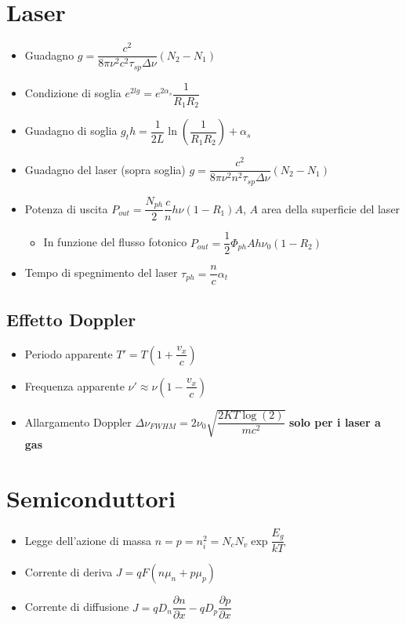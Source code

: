 \documentclass{article}
\begin{document}
\newpage

\section{Laser}
\begin{itemize}
  \item Guadagno \( g = \dfrac{c^2}{8 \pi \nu^2 c^2 \tau_{sp} \Delta \nu} (N_2 - N_1) \)
  \item Condizione di soglia \( e ^ {2lg} = e^ {2 \alpha_s } \dfrac{1}{R_1 R_2} \)
  \item Guadagno di soglia \( g_th = \dfrac{1}{2L} \ln\left(\dfrac{1}{R_1 R_2}\right) + \alpha_s \)
  \item Guadagno del laser (sopra soglia) \( g = \dfrac{c^2}{8 \pi \nu^2 n ^ 2 \tau_{sp} \Delta \nu} (N_2 - N_1) \)
  \item Potenza di uscita \( P_{out} = \dfrac{N_{ph}}{2} \dfrac{c}{n} h \nu (1 - R_1) A \), \( A \) area della superficie del laser
        \begin{itemize}
          \item In funzione del flusso fotonico \( P_{out} = \dfrac{1}{2} \Phi_{ph} A h \nu_0 ( 1 - R_2) \)
        \end{itemize}
  \item Tempo di spegnimento del laser \( \tau_{ph} = \dfrac{n}{c} \alpha_t \)
\end{itemize}

\subsection{Effetto Doppler}
\begin{itemize}
  \item Periodo apparente \( T ' = T \left( 1 + \dfrac{v_x}{c} \right) \)
  \item Frequenza apparente \( \nu ' \approx \nu \left(1 - \dfrac{v_x}{c} \right) \)
  \item Allargamento Doppler \( \Delta \nu_{FWHM} = 2 \nu_0 \sqrt{\dfrac{2 K T \log(2)}{m c ^ 2}} \) \textbf{solo per i laser a gas}
\end{itemize}

\newpage

\section{Semiconduttori}
\begin{itemize}
  \item Legge dell'azione di massa \( n = p = n_i ^ 2 = N_c N_v \exp{\dfrac{E_g}{k T}} \)
  \item Corrente di deriva \( J = q F (n \mu_n + p \mu_p) \)
  \item Corrente di diffusione \( J = q D_n \dfrac{\partial n}{\partial x} - q D_p \dfrac{\partial p}{\partial x} \)
\end{itemize}
\end{document}

